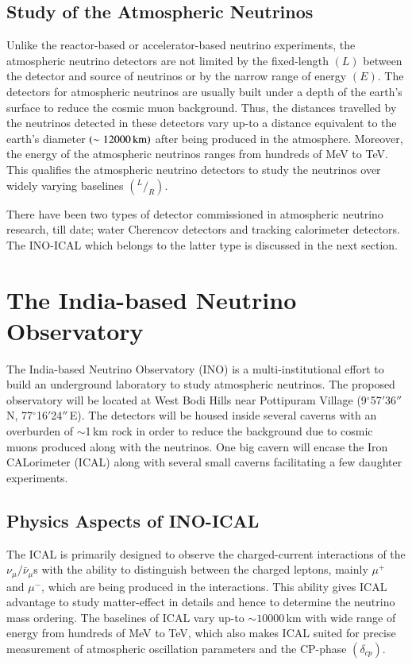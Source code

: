 \subsection{Study of the Atmospheric Neutrinos}
Unlike the reactor-based or accelerator-based neutrino experiments, the atmospheric neutrino detectors are not limited by the fixed-length $\left(L\right)$ between the detector and source of neutrinos or by the narrow range of energy $\left(E\right)$. The detectors for atmospheric neutrinos are usually built under a depth of the earth's surface to reduce the cosmic muon background. Thus, the distances travelled by the neutrinos detected in these detectors vary up-to a distance equivalent to the earth's diameter $\left(\sim 12000\text{\,km}\right)$ after being produced in the atmosphere. Moreover, the energy of the atmospheric neutrinos ranges from hundreds of MeV to TeV. This qualifies the atmospheric neutrino detectors to study the neutrinos over widely varying baselines $\left(^{L}/_{R}\right)$.

There have been two types of detector commissioned in atmospheric neutrino research, till date; water Cherencov detectors and tracking calorimeter detectors. The INO-ICAL which belongs to the latter type is discussed in the next section.

\section{The India-based Neutrino Observatory}
The India-based Neutrino Observatory (INO)\cite{inowhite,inoreport} is a multi-institutional effort to build an underground laboratory to study atmospheric neutrinos. The proposed observatory will be located at West Bodi Hills near Pottipuram Village (9$^\circ$57$'$36$''$\,N, 77$^\circ$16$'$24$''$\,E). The detectors will be housed inside several caverns with an overburden of $\sim$1\,km rock in order to reduce the background due to cosmic muons produced along with the neutrinos. One big cavern will encase the Iron CALorimeter (ICAL) along with several small caverns facilitating a few daughter experiments.

\subsection{Physics Aspects of INO-ICAL}
The ICAL is primarily designed to observe the charged-current interactions of the $\nu_{\mu}/\bar{\nu}_{\mu}$s with the ability to distinguish between the charged leptons, mainly $\mu^{+}$ and $\mu^{-}$, which are being produced in the interactions. This ability gives ICAL advantage to study matter-effect in details and hence to determine the neutrino mass ordering. The baselines of ICAL vary up-to $\sim 10000$\,km with wide range of energy from hundreds of MeV to TeV, which also makes ICAL suited for precise measurement of atmospheric oscillation parameters and the CP-phase $\left(\delta_{cp}\right)$.

